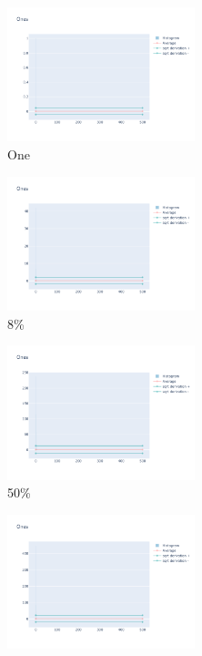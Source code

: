 \documentclass[12pt, fleqn]{report}                             %
\theoremstyle{break}                                            %
\begin{document}
      \begin{figure}[ht!]
        \centering
        \begin{subfigure}[b]{0.4\linewidth}
          \includegraphics[width=0.6\textwidth]{Images/40/dia-a.png}
          \caption{One}
        \end{subfigure}
        \begin{subfigure}[b]{0.4\linewidth}
          \includegraphics[width=0.6\textwidth]{Images/40/dia-b.png}
          \caption{8\%}
        \end{subfigure}
        \begin{subfigure}[b]{0.4\linewidth}
          \includegraphics[width=0.6\textwidth]{Images/40/dia-c.png}
          \caption{50\%}
        \end{subfigure}
        \begin{subfigure}[b]{0.4\linewidth}
          \includegraphics[width=0.6\textwidth]{Images/40/dia-d.png}

\end{subfigure}
\end{figure}
\end{document}

